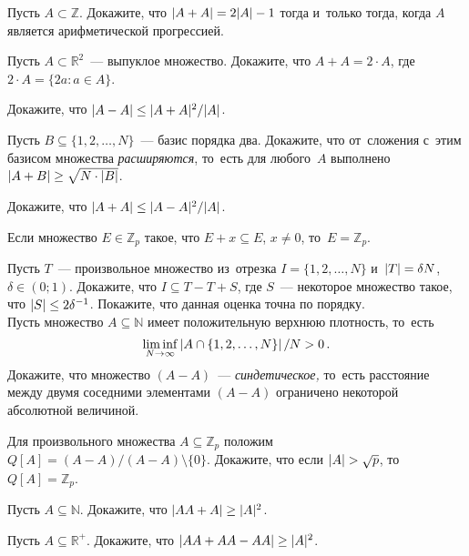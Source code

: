 \begin{problems}

\item
Пусть $A \subset \mathbb{Z}$.
Докажите, что $\lvert A + A \rvert = 2 \lvert A \rvert - 1$ тогда и~только
тогда, когда $A$ является арифметической прогрессией.

\item
Пусть $A \subset \mathbb{R}^2$~--- выпуклое множество.
Докажите, что $A + A = 2 \cdot A$, где
\(
    2 \cdot A
=
    \{ 2 a \colon a \in A \}
\).

\item
Докажите, что
\(
    \lvert A - A \rvert
\leq
    \lvert A + A \rvert^2 / \lvert A \rvert
\).

\item
Пусть $B \subseteq \{ 1, 2, \ldots, N \}$~--- базис порядка два.
Докажите, что от~сложения с~этим базисом множества \emph{расширяются},
то~есть для любого~$A$ выполнено
\(
    \lvert A + B \rvert \geq \sqrt{N \cdot \lvert B \rvert}
\).

\item
Докажите, что
\(
    \lvert A + A \rvert
\leq
    \lvert A - A \rvert^2 / \lvert A \rvert
\).

\item
Если множество $E \in \mathbb{Z}_p$ такое, что $E + x \subseteq E$, $x \neq 0$,
то~$E = \mathbb{Z}_p$.

\item
\subproblem
Пусть $T$~--- произвольное множество из~отрезка $I = \{ 1, 2, \ldots, N \}$
и~$\lvert T \rvert = \delta N$, $\delta \in (0; 1)$.
Докажите, что $I \subseteq T - T + S$, где $S$~--- некоторое множество такое,
что $\lvert S \rvert \leq 2 \delta^{-1}$.
Покажите, что данная оценка точна по порядку.
\\
\subproblem
Пусть множество $A \subseteq \mathbb{N}$ имеет положительную верхнюю плотность,
то~есть
\[
    \liminf_{N \to \infty}
        \left\lvert 
            A \cap \{ 1, 2, \ldots, N \}
         \right\rvert / N
>
    0
\, . \]
Докажите, что множество $(A - A)$~--- \emph{синдетическое,} то~есть расстояние
между двумя соседними элементами $(A - A)$ ограничено некоторой абсолютной
величиной.

\item
Для произвольного множества $A \subseteq \mathbb{Z}_p$ положим
\(
    Q[A] = (A - A) / (A - A) \setminus \{ 0 \}
\).
Докажите, что если $\lvert A \rvert > \sqrt{p}$, то~$Q[A] = \mathbb{Z}_p$.

\item
Пусть $A \subseteq \mathbb{N}$.
Докажите, что $\lvert A A + A \rvert \geq \lvert A \rvert^2$.

\item
Пусть $A \subseteq \mathbb{R}^{+}$.
Докажите, что $\lvert A A + A A - A A \rvert \geq \lvert A \rvert^2$.

\end{problems}


